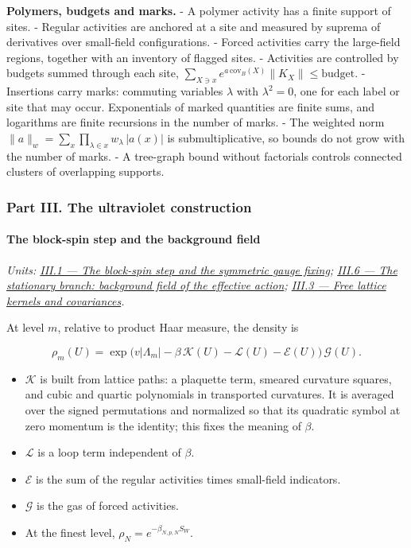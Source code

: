 \documentclass[
  letterpaper,
  11pt]{article}
\providecommand{\tightlist}{%
  \setlength{\itemsep}{0pt}\setlength{\parskip}{0pt}}
\begin{document}
\textbf{Polymers, budgets and marks.} - A polymer activity has a finite
support of sites. - Regular activities are anchored at a site and
measured by suprema of derivatives over small-field configurations. -
Forced activities carry the large-field regions, together with an
inventory of flagged sites. - Activities are controlled by budgets
summed through each site,
\(\sum_{X\ni x}e^{a\,\mathrm{cov}_B(X)}\lVert K_X\rVert\le\text{budget}\).
- Insertions carry marks: commuting variables \(\lambda\) with
\(\lambda^2=0\), one for each label or site that may occur. Exponentials
of marked quantities are finite sums, and logarithms are finite
recursions in the number of marks. - The weighted norm
\(\lVert a\rVert_w=\sum_x\prod_{\lambda\in x}w_\lambda\,|a(x)|\) is
submultiplicative, so bounds do not grow with the number of marks. - A
tree-graph bound without factorials controls connected clusters of
overlapping supports.

\subsubsection{Part III. The ultraviolet
construction}\label{part-iii.-the-ultraviolet-construction}

\paragraph{The block-spin step and the background
field}\label{the-block-spin-step-and-the-background-field}

\emph{Units:
\href{https://github.com/scottnarmstrong/yang-mills-informalization/blob/main/outline/units/III-1.md}{III.1
--- The block-spin step and the symmetric gauge fixing};
\href{https://github.com/scottnarmstrong/yang-mills-informalization/blob/main/outline/units/III-6.md}{III.6
--- The stationary branch: background field of the effective action};
\href{https://github.com/scottnarmstrong/yang-mills-informalization/blob/main/outline/units/III-3.md}{III.3
--- Free lattice kernels and covariances}.}

At level \(m\), relative to product Haar measure, the density is

\[\rho_m(U)=\exp\big(v|\Lambda_m|-\beta\,\mathcal K(U)-\mathcal L(U)-\mathcal E(U)\big)\,\mathcal G(U).\]

\begin{itemize}
\tightlist
\item
  \(\mathcal K\) is built from lattice paths: a plaquette term, smeared
  curvature squares, and cubic and quartic polynomials in transported
  curvatures. It is averaged over the signed permutations and normalized
  so that its quadratic symbol at zero momentum is the identity; this
  fixes the meaning of \(\beta\).
\item
  \(\mathcal L\) is a loop term independent of \(\beta\).
\item
  \(\mathcal E\) is the sum of the regular activities times small-field
  indicators.
\item
  \(\mathcal G\) is the gas of forced activities.
\item
  At the finest level, \(\rho_N=e^{-\beta_{N,p,N}S_W}\).
\end{itemize}
\end{document}
